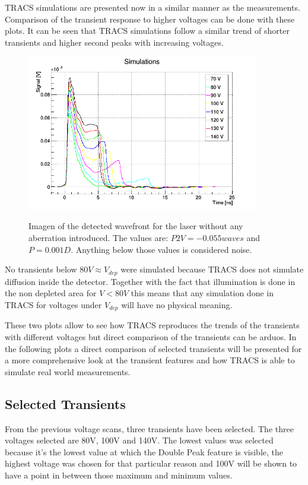 TRACS simulations are presented now in a similar manner as the measurements. Comparison of the transient response to higher voltages can be done with these plots. It can be seen that TRACS simulations follow a similar trend of shorter transients and higher second peaks with increasing voltages.

\begin{figure}[h]
	\centering
	\includegraphics[width=0.9\textwidth]{AllSims.png}
	\label{fig:mues2}
	\caption{Imagen of the detected wavefront for the laser without any aberration introduced. The values are: $P2V = -0.055waves$ and $P = 0.001D$. Anything below those values is considered noise.}
\end{figure}

No transients below $80V \approx V_{dep}$ were simulated because TRACS does not simulate diffusion inside the detector. Together with the fact that illumination is done in the non depleted area for $V < 80V$ this means that any simulation done in TRACS for voltages under $V_{dep}$ will have no physical meaning.

These two plots allow to see how TRACS reproduces the trends of the transients with different voltages but direct comparison of the transients can be arduos. In the following plots a direct comparison of selected transients will be presented for a more comprehensive look at the transient features and how TRACS is able to simulate real world measurements.

\subsection{Selected Transients}

From the previous voltage scans, three transients have been selected. The three voltages selected are 80V, 100V and 140V. The lowest values was selected because it's the lowest value at which the Double Peak feature is visible, the highest voltage was chosen for that particular reason and 100V will be shown to have a point in between those maximum and minimum values.

